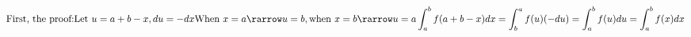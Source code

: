 \documentclass[preview]{standalone}
\begin{document}
\begin{align*}
\text{First, the proof:} \text{Let } u = a + b - x, du = -dx \text{When } x = a \rarrow u = b, \text{when } x = b \rarrow u = a \int_a^b f(a+b-x)dx = \int_b^a f(u)(-du) = \int_a^b f(u) du = \int_a^b f(x) dx
\end{align*}
\end{document}
